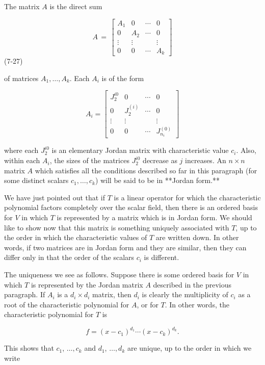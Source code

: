 The matrix \(A\) is the direct sum

\[A\,=\,\begin{bmatrix}A_{1}&0&\cdots&0\\ 0&A_{2}&\cdots&0\\ \vdots&\vdots&&\vdots\\ 0&0&\cdots&A_{k}\end{bmatrix}\] (7-27)

of matrices \(A_{1},\ldots,A_{k}\). Each \(A_{i}\) is of the form

\[A_{i}=\begin{bmatrix}J_{2}^{i0}&0&\cdots&0\\ 0&J_{2}^{(i)}&\cdots&0\\ \vdots&\vdots&&\vdots\\ 0&0&\cdots&J_{n_{i}}^{(0)}\end{bmatrix}\]

where each \(J_{2}^{i0}\) is an elementary Jordan matrix with characteristic value \(c_{i}\). Also, within each \(A_{i}\), the sizes of the matrices \(J_{2}^{i0}\) decrease as \(j\) increases. An \(n\times n\) matrix \(A\) which satisfies all the conditions described so far in this paragraph (for some distinct scalars \(c_{1},\ldots,c_{k}\)) will be said to be in **Jordan form.**

We have just pointed out that if \(T\) is a linear operator for which the characteristic polynomial factors completely over the scalar field, then there is an ordered basis for \(V\) in which \(T\) is represented by a matrix which is in Jordan form. We should like to show now that this matrix is something uniquely associated with \(T\), up to the order in which the characteristic values of \(T\) are written down. In other words, if two matrices are in Jordan form and they are similar, then they can differ only in that the order of the scalars \(c_{i}\) is different.

The uniqueness we see as follows. Suppose there is some ordered basis for \(V\) in which \(T\) is represented by the Jordan matrix \(A\) described in the previous paragraph. If \(A_{i}\) is a \(d_{i}\times d_{i}\) matrix, then \(d_{i}\) is clearly the multiplicity of \(c_{i}\) as a root of the characteristic polynomial for \(A\), or for \(T\). In other words, the characteristic polynomial for \(T\) is

\[f=(x-c_{1})^{d_{1}}\cdots(x-c_{k})^{d_{k}}.\]

This shows that \(c_{1}\), \(\ldots,c_{k}\) and \(d_{1}\), \(\ldots,d_{k}\) are unique, up to the order in which we write 